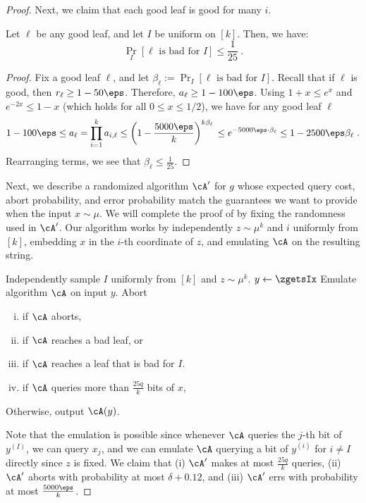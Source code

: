 \documentclass{toc}
\begin{document}
\begin{proof}
  Next, we claim that each good leaf is good for many $i$.
  \begin{claim}\label{claim:leaf-good-i}
    Let $\ell$ be any good leaf, and let $I$ be uniform on $[k]$.
    Then, we have: $$\Pr_I[\ell \text{ is bad for } I] \leq \frac{1}{25}\ .$$
  \end{claim}
  \begin{proof}
    Fix a good leaf $\ell$, and let
    $\beta_\ell := \Pr_I[\ell \text{ is bad for } I]$.
    Recall that if $\ell$ is good, then $r_\ell \geq 1-50\eps$.
    Therefore, $a_\ell \geq 1-100\eps$.  Using $1+x\leq e^x$ and
    $e^{-2x} \leq 1-x$ (which holds for all $0\leq x \leq 1/2$), we
    have for any good leaf $\ell$
    $$1-100\eps \leq a_\ell = \prod_{i=1}^k a_{i,\ell} \\ \leq
    \left(1-\frac{5000\eps}{k}\right)^{k\beta_\ell} \\ \leq
    e^{-5000\eps\cdot \beta_\ell} \\
    \leq 1-2500\eps\beta_\ell\ .$$ Rearranging terms, we see that
    $\beta_\ell \leq \frac{1}{25}$.
  \end{proof}

  Next, we describe a randomized algorithm $\cA'$ for $g$ whose
  expected query cost, abort probability, and error probability match
  the guarantees we want to provide when the input $x \sim \mu$.
  We will %
  complete the proof of  by
  fixing the randomness used in $\cA'$.  Our algorithm works by
  independently $z \sim \mu^k$ and  $i$ uniformly from $[k]$,
  embedding $x$ in the $i$-th coordinate of $z$, and emulating $\cA$
  on the resulting string.

  \begin{algorithm}
    \caption{$\cA'(x)$}
    \begin{algorithmic}[1]
      \State Independently sample $I$ uniformly from $[k]$ and  $z \sim \mu^k$.
      \State $y \gets \zgetsIx$
      \State Emulate algorithm $\cA$ on input $y$.
      \State Abort
      \begin{enumerate}[(i)]
      \item if $\cA$ aborts,
      \item if $\cA$ reaches a bad leaf, or
      \item if $\cA$ reaches a leaf that is bad for $I$.
      \item if $\cA$ queries more than
        $\frac{25q}{k}$ bits of $x$,
      \end{enumerate}
      \State
      Otherwise, output $\cA(y)$.
    \end{algorithmic}
  \end{algorithm}
  Note that the emulation is possible since whenever $\cA$ queries the
  $j$-th bit of $y^{(I)}$, we can query $x_j$, and we can emulate
  $\cA$ querying a bit of $y^{(i)}$ for $i\neq I$ directly since $z$
  is fixed.  We claim that (i) $\cA'$ makes at most $\frac{25q}{k}$
  queries, (ii) $\cA'$ aborts with probability at most
  $\delta + 0.12$, and (iii) $\cA'$ errs with probability at most
  $\frac{5000\eps}{k}$.


\end{proof}
\end{document}
